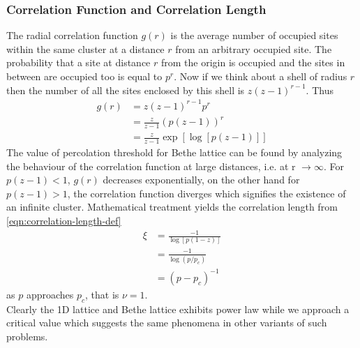 	\subsubsection{Correlation Function and Correlation Length}
	The radial correlation function $g(r)$ is the average number of occupied sites within the same cluster at a distance $r$ from an arbitrary occupied site. The probability that a site at distance $r$ from the origin is occupied and the sites in between are occupied too is equal to $p^r$. Now if we think about a shell of radius $r$ then the number of all the sites enclosed by this shell is $z(z-1)^{r-1}$. Thus
	\begin{align}
		g(r) &= z(z-1)^{r-1} p^r \\
			 &= \frac{z}{z-1} \left(p(z-1)\right)^r \\
			 &= \frac{z}{z-1} \exp \left[\log\left[p(z-1)\right]\right]
	\end{align}
	The value of percolation threshold for Bethe lattice can be found by analyzing the behaviour of the correlation function at large distances, i.e. at r $\rightarrow \infty$. For $p(z-1) < 1$, $g(r)$ decreases exponentially, on the other hand for $p(z-1)>1$, the correlation function diverges which signifies the existence of an infinite cluster. Mathematical treatment yields the correlation length from \ref{eqn:correlation-length-def}
	\begin{align}
		\xi &= \frac{-1}{\log[p(1-z)]} \nonumber \\
			&= \frac{-1}{\log(p/p_c)} \nonumber \\
			&= (p-p_c)^{-1}
	\end{align}
	as $p$ approaches $p_c$, that is $\nu = 1$. \\
	Clearly the 1D lattice and Bethe  lattice exhibits power law while we approach a critical value which suggests the same phenomena in other variants of such problems.

